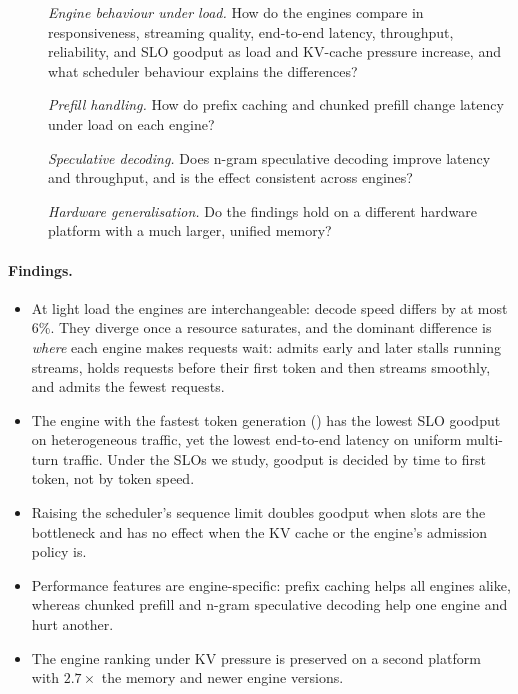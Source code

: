 \begin{description}
  \item[] \emph{Engine behaviour under load.} How do the engines compare in
  responsiveness, streaming quality, end-to-end latency, throughput, reliability, and SLO
  goodput as load and KV-cache pressure increase, and what scheduler behaviour explains the
  differences?
  \item[] \emph{Prefill handling.} How do prefix caching and chunked prefill change
  latency under load on each engine?
  \item[] \emph{Speculative decoding.} Does n-gram speculative decoding improve
  latency and throughput, and is the effect consistent across engines?
  \item[] \emph{Hardware generalisation.} Do the  findings hold on a
  different hardware platform with a much larger, unified memory?
\end{description}

\paragraph{Findings.}
\begin{itemize}
  \item At light load the engines are interchangeable: decode speed differs by at most 6\%.
  They diverge once a resource saturates, and the dominant difference is \emph{where} each
  engine makes requests wait: \vllm admits early and later stalls running streams,
  \sglang holds requests before their first token and then streams smoothly, and \trt admits
  the fewest requests.
  \item The engine with the fastest token generation (\trt) has the lowest SLO goodput on
  heterogeneous traffic, yet the lowest end-to-end latency on uniform multi-turn traffic.
  Under the SLOs we study, goodput is decided by time to first token, not by token speed.
  \item Raising the scheduler's sequence limit doubles goodput when slots are the bottleneck
  and has no effect when the KV cache or the engine's admission policy is.
  \item Performance features are engine-specific: prefix caching helps all engines alike,
  whereas chunked prefill and n-gram speculative decoding help one engine and hurt another.
  \item The engine ranking under KV pressure is preserved on a second platform with
  $2.7\times$ the memory and newer engine versions.
\end{itemize}

